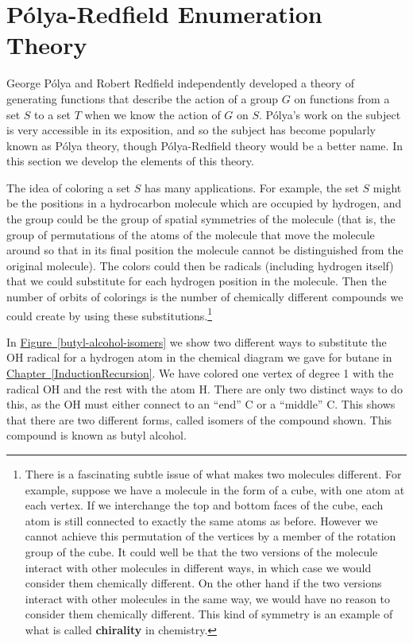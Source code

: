 \documentclass[10pt,]{book}
\newcommand{\terminology}[1]{\textbf{#1}}
\theoremstyle{plain}
\theoremstyle{definition}
\theoremstyle{definition}
\numberwithin{equation}{chapter}
\begin{document}
\section[{Pólya-Redfield Enumeration Theory}]{Pólya-Redfield Enumeration Theory}\label{sec_groups-polya}
\hypertarget{p-1730}{}%
George Pólya and Robert Redfield independently developed a theory of generating functions that describe the action of a group \(G\) on functions from a set \(S\) to a set \(T\) when we know the action of \(G\) on \(S\). Pólya's work on the subject is very accessible in its exposition, and so the subject has become popularly known as Pólya theory, though Pólya-Redfield theory would be a better name. In this section we develop the elements of this theory.%
\par
\hypertarget{p-1731}{}%
The idea of coloring a set \(S\) has many applications. For example, the set \(S\) might be the positions in a hydrocarbon molecule which are occupied by hydrogen, and the group could be the group of spatial symmetries of the molecule (that is, the group of permutations of the atoms of the molecule that move the molecule around so that in its final position the molecule cannot be distinguished from the original molecule). The colors could then be radicals (including hydrogen itself) that we could substitute for each hydrogen position in the molecule. Then the number of orbits of colorings is the number of chemically different compounds we could create by using these substitutions.\footnote{There is a fascinating subtle issue of what makes two molecules different.  For example, suppose we have a molecule in the form of a cube, with one atom at each vertex.  If we interchange the top and bottom faces of the cube, each atom is still connected to exactly the same atoms as before.   However we cannot achieve this permutation of the vertices by a member of the rotation group of the cube.  It could well be that the two versions of the molecule interact with other molecules in different ways, in which case we would consider them chemically different.  On the other hand if the two versions interact with other molecules in the same way, we would have no reason to consider them chemically different.  This kind of symmetry is an example of what is called \terminology{chirality} in chemistry.\label{fn-24}}%
\par
\hypertarget{p-1732}{}%
In \hyperref[butyl-alcohol-isomers]{Figure~\ref{butyl-alcohol-isomers}} we show two different ways to substitute the OH radical for a hydrogen atom in the chemical diagram we gave for butane in \hyperref[InductionRecursion]{Chapter~\ref{InductionRecursion}}. We have colored one vertex of degree 1 with the radical OH and the rest with the atom H. There are only two distinct ways to do this, as the OH must either connect to an ``end'' C or a ``middle'' C. This shows that there are two different forms, called isomers of the compound shown. This compound is known as butyl alcohol.%
\end{document}
